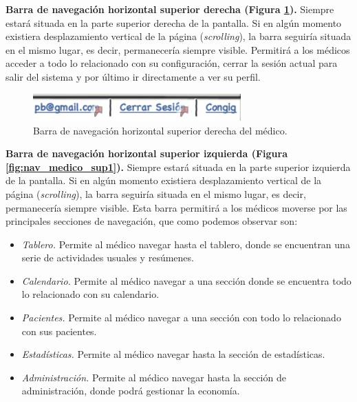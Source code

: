 \documentclass[a4paper,oneside,11pt]{book}
\begin{document}
			\textbf{Barra de navegación horizontal superior derecha (Figura \ref{fig:nav_medico_sup2}).} Siempre estará situada en la parte superior derecha de la pantalla. Si en algún momento existiera desplazamiento vertical de la página (\textit{scrolling}), la barra seguiría situada en el mismo lugar, es decir, permanecería siempre visible. Permitirá a los médicos acceder a todo lo relacionado con su configuración, cerrar la sesión actual para salir del sistema y por último ir directamente a ver su perfil.
			
			\begin{figure}[H]
			  \centering
			    \includegraphics[width=8cm]{img/jpg/nav/medico_sup2.jpg}
			  \caption{Barra de navegación horizontal superior derecha del médico.}
			  \label{fig:nav_medico_sup2}
			\end{figure}
			
			
			\textbf{Barra de navegación horizontal superior izquierda (Figura \ref{fig:nav_medico_sup1}).} Siempre estará situada en la parte superior izquierda de la pantalla. Si en algún momento existiera desplazamiento vertical de la página (\textit{scrolling}), la barra seguiría situada en el mismo lugar, es decir, permanecería siempre visible. Esta barra permitirá a los médicos moverse por las principales secciones de navegación, que como podemos observar son:
			\begin{itemize}
				\item \textit{Tablero.} Permite al médico navegar hasta el tablero, donde se encuentran una serie de actividades usuales y resúmenes.
				\item \textit{Calendario.} Permite al médico navegar a una sección donde se encuentra todo lo relacionado con su calendario.
				\item \textit{Pacientes.} Permite al médico navegar a una sección con todo lo relacionado con sus pacientes.
				\item \textit{Estadísticas.} Permite al médico navegar hasta la sección de estadísticas.
				\item \textit{Administración.} Permite al médico navegar hasta la sección de administración, donde podrá gestionar la economía.
			\end{itemize}
			
			
\end{document}
